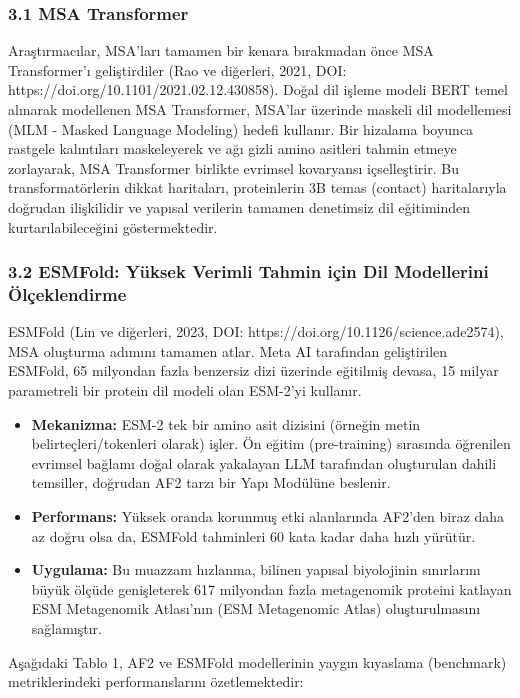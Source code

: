 \documentclass[11pt,a4paper]{article}
\begin{document}
\subsubsection{3.1 MSA Transformer}
Araştırmacılar, MSA'ları tamamen bir kenara bırakmadan önce MSA Transformer'ı geliştirdiler (Rao ve diğerleri, 2021, DOI: https://doi.org/10.1101/2021.02.12.430858). Doğal dil işleme modeli BERT temel alınarak modellenen MSA Transformer, MSA'lar üzerinde maskeli dil modellemesi (MLM - Masked Language Modeling) hedefi kullanır. Bir hizalama boyunca rastgele kalıntıları maskeleyerek ve ağı gizli amino asitleri tahmin etmeye zorlayarak, MSA Transformer birlikte evrimsel kovaryansı içselleştirir. Bu transformatörlerin dikkat haritaları, proteinlerin 3B temas (contact) haritalarıyla doğrudan ilişkilidir ve yapısal verilerin tamamen denetimsiz dil eğitiminden kurtarılabileceğini göstermektedir.

\subsubsection{3.2 ESMFold: Yüksek Verimli Tahmin için Dil Modellerini Ölçeklendirme}
ESMFold (Lin ve diğerleri, 2023, DOI: https://doi.org/10.1126/science.ade2574), MSA oluşturma adımını tamamen atlar. Meta AI tarafından geliştirilen ESMFold, 65 milyondan fazla benzersiz dizi üzerinde eğitilmiş devasa, 15 milyar parametreli bir protein dil modeli olan ESM-2'yi kullanır.

\begin{itemize}
  \item \textbf{Mekanizma:} ESM-2 tek bir amino asit dizisini (örneğin metin belirteçleri/tokenleri olarak) işler. Ön eğitim (pre-training) sırasında öğrenilen evrimsel bağlamı doğal olarak yakalayan LLM tarafından oluşturulan dahili temsiller, doğrudan AF2 tarzı bir Yapı Modülüne beslenir.
  \item \textbf{Performans:} Yüksek oranda korunmuş etki alanlarında AF2'den biraz daha az doğru olsa da, ESMFold tahminleri 60 kata kadar daha hızlı yürütür.
  \item \textbf{Uygulama:} Bu muazzam hızlanma, bilinen yapısal biyolojinin sınırlarını büyük ölçüde genişleterek 617 milyondan fazla metagenomik proteini katlayan ESM Metagenomik Atlası'nın (ESM Metagenomic Atlas) oluşturulmasını sağlamıştır.
\end{itemize}
Aşağıdaki Tablo 1, AF2 ve ESMFold modellerinin yaygın kıyaslama (benchmark) metriklerindeki performanslarını özetlemektedir:
\end{document}
